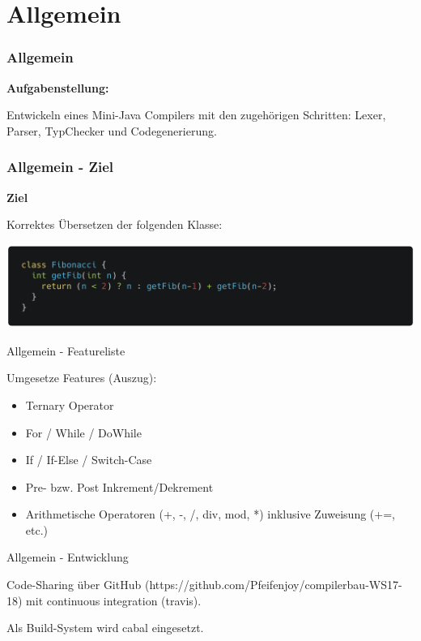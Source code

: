 \section{Allgemein}

\begin{frame}
	\frametitle{Allgemein}
	
\textbf{Aufgabenstellung:}

Entwickeln eines Mini-Java Compilers mit den zugehörigen Schritten: Lexer, Parser, TypChecker und Codegenerierung.
\end{frame}

\begin{frame}[fragile]
\frametitle{Allgemein - Ziel}

\textbf{Ziel} 

Korrektes Übersetzen der folgenden Klasse:

\begin{center}
	\includegraphics[width=\textwidth]{images/allgemein/fibonacci}
\end{center}
\end{frame}



\begin{frame}{Allgemein - Featureliste}

Umgesetze Features (Auszug):

\pause

\begin{itemize}
	\item Ternary Operator \pause
	\item For / While / DoWhile \pause
	\item If / If-Else / Switch-Case \pause 
	\item Pre- bzw. Post Inkrement/Dekrement \pause 
	\item Arithmetische Operatoren (+, -, /, div, mod, *) inklusive Zuweisung (+=, etc.)
\end{itemize}	
\end{frame}

\begin{frame}{Allgemein - Entwicklung}

Code-Sharing über GitHub (https://github.com/Pfeifenjoy/compilerbau-WS17-18) mit continuous integration (travis).

\par \medskip

\pause

Als Build-System wird cabal eingesetzt.	
\end{frame}

